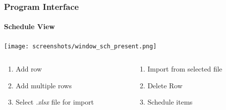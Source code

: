 \documentclass{beamer}
\newcounter{savedenum}
\newcommand*{\saveenum}{\setcounter{savedenum}{\theenumi}}
\newcommand*{\resume}{\setcounter{enumi}{\thesavedenum}}
\begin{document}
\begin{frame}
  \frametitle{Program Interface}
  \framesubtitle{Schedule View}
    \centering
    \texttt{[image: screenshots/window\_sch\_present.png]}
    \pause
    \begin{columns}
      \begin{column}{0.5\textwidth}
        \begin{enumerate}[<+->]
          \item Add row
          \item Add multiple rows
          \item Select \emph{.xlsx} file for import
          \saveenum
        \end{enumerate}
      \end{column}
      \begin{column}{0.5\textwidth}
        \begin{enumerate}[<+->]
          \resume
          \item Import from selected file
          \item Delete Row
          \item Schedule items
        \end{enumerate}
      \end{column}
    \end{columns}
\end{frame}
\end{document}
